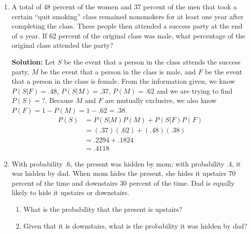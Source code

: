 \documentclass{report}
\begin{document}
\begin{enumerate}
\item A total of 48 percent of the women and 37 percent
of the men that took a certain “quit smoking” class
remained nonsmokers for at least one year after
completing the class. These people then attended
a success party at the end of a year. If 62 percent
of the original class was male, what percentage of the original class attended
the party?

{\bf Solution:} Let $S$ be the event that a person in the class attends the success party, $M$ be the event that a person in the class is male, and $F$ be the event that a person in the class is female. From the information given, we know $P(S\vert F)=.48$, $P(S\vert M)=.37$, $P(M)=.62$ and we are trying to find $P(S) = ?$. Because $M$ and $F$ are mutually exclusive, we also know $P(F)=1-P(M)=1-.62=.38$.
\begin{align*}
    P(S) &= P(S\vert M)P(M)+P(S\vert F)P(F) \\
    &=(.37)(.62)+(.48)(.38) \\
    &=.2294+.1824 \\
    &=.4118
\end{align*}


\item With probability .6, the present was hidden by
mom; with probability .4, it was hidden by dad.
When mom hides the present, she hides it upstairs
70 percent of the time and downstairs 30 percent
of the time. Dad is equally likely to hide it upstairs
or downstairs.
\begin{enumerate}
\item What is the probability that the present is
upstairs?
\item Given that it is downstairs, what is the probability
it was hidden by dad?
\end{enumerate}


\end{enumerate}
\end{document}
